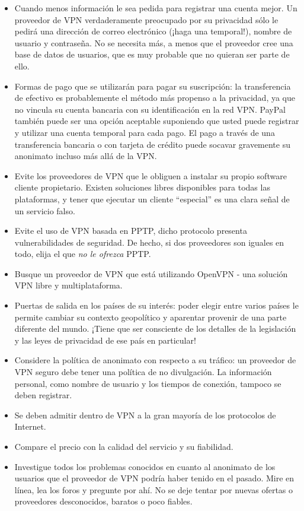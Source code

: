 \documentclass[10pt,a5paper,twoside,,]{book}
\providecommand{\tightlist}{%
  \setlength{\itemsep}{0pt}\setlength{\parskip}{0pt}}
\begin{document}
\begin{itemize}
\tightlist
\item
  Cuando menos información le sea pedida para registrar una cuenta
  mejor. Un proveedor de VPN verdaderamente preocupado por su privacidad
  sólo le pedirá una dirección de correo electrónico (¡haga una
  temporal!), nombre de usuario y contraseña. No se necesita más, a
  menos que el proveedor cree una base de datos de usuarios, que es muy
  probable que no quieran ser parte de ello.
\item
  Formas de pago que se utilizarán para pagar su suscripción: la
  transferencia de efectivo es probablemente el método más propenso a la
  privacidad, ya que no vincula su cuenta bancaria con su identificación
  en la red VPN. PayPal también puede ser una opción aceptable
  suponiendo que usted puede registrar y utilizar una cuenta temporal
  para cada pago. El pago a través de una transferencia bancaria o con
  tarjeta de crédito puede socavar gravemente su anonimato incluso más
  allá de la VPN.
\item
  Evite los proveedores de VPN que le obliguen a instalar su propio
  software cliente propietario. Existen soluciones libres disponibles
  para todas las plataformas, y tener que ejecutar un cliente
  ``especial'' es una clara señal de un servicio falso.
\item
  Evite el uso de VPN basada en PPTP, dicho protocolo presenta
  vulnerabilidades de seguridad. De hecho, si dos proveedores son
  iguales en todo, elija el que \emph{no le ofrezca} PPTP.
\item
  Busque un proveedor de VPN que está utilizando OpenVPN - una solución
  VPN libre y multiplataforma.
\item
  Puertas de salida en los países de su interés: poder elegir entre
  varios países le permite cambiar su contexto geopolítico y aparentar
  provenir de una parte diferente del mundo. ¡Tiene que ser consciente
  de los detalles de la legislación y las leyes de privacidad de ese
  país en particular!
\item
  Considere la política de anonimato con respecto a su tráfico: un
  proveedor de VPN seguro debe tener una política de no divulgación. La
  información personal, como nombre de usuario y los tiempos de
  conexión, tampoco se deben registrar.
\item
  Se deben admitir dentro de VPN a la gran mayoría de los protocolos de
  Internet.
\item
  Compare el precio con la calidad del servicio y su fiabilidad.
\item
  Investigue todos los problemas conocidos en cuanto al anonimato de los
  usuarios que el proveedor de VPN podría haber tenido en el pasado.
  Mire en línea, lea los foros y pregunte por ahí. No se deje tentar por
  nuevas ofertas o proveedores desconocidos, baratos o poco fiables.
\end{itemize}
\end{document}
